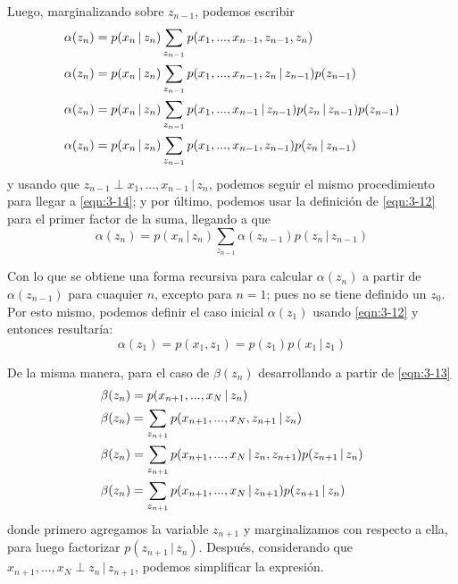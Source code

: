 Luego, marginalizando sobre $z_{n-1}$, podemos escribir
\begin{align}  
  \alpha(z_n) &= p(x_n \,|\, z_n) \sum_{z_{n-1}} 
    p(x_1, ..., x_{n-1}, z_{n-1}, z_n) 
    \notag \\ 
  \alpha(z_n) &= p(x_n \,|\, z_n) \sum_{z_{n-1}} 
    p(x_1, ..., x_{n-1}, z_n \,|\, z_{n-1}) p(z_{n-1})
    \notag \\ 
  \alpha(z_n) &= p(x_n \,|\, z_n) \sum_{z_{n-1}} 
    p(x_1, ..., x_{n-1} \,|\, z_{n-1}) p(z_n \,|\, z_{n-1}) p(z_{n-1})
    \notag \\ 
  \alpha(z_n) &= p(x_n \,|\, z_n) \sum_{z_{n-1}} 
    p(x_1, ..., x_{n-1}, z_{n-1}) p(z_n \,|\, z_{n-1})
    \label{eqn:3-14}
\end{align}
y usando que $z_{n-1} \perp x_1, ... , x_{n-1} \,|\, z_n$, podemos seguir el mismo procedimiento para llegar a \eqref{eqn:3-14}; y por último, podemos usar la definición de \eqref{eqn:3-12} para el primer factor de la suma, llegando a que
\begin{equation}
  \alpha(z_n) = p(x_n \,|\, z_n) \sum_{z_{n-1}} 
    \alpha(z_{n-1}) p(z_n \,|\, z_{n-1})
    \label{eqn:3-15}
\end{equation}

Con lo que se obtiene una forma recursiva para calcular $\alpha(z_n)$ a partir de $\alpha(z_{n-1})$ para cuaquier $n$, excepto para $n = 1$; pues no se tiene definido un $z_0$. Por esto mismo, podemos definir el caso inicial $\alpha(z_1)$ usando \eqref{eqn:3-12} y entonces resultaría:
\begin{equation}
  \alpha(z_1) = p(x_1, z_1) = p(z_1) p(x_1 \,|\, z_1) 
  \label{eqn:3-16}
\end{equation}

De la misma manera, para el caso de $\beta(z_n)$ desarrollando a partir de  \eqref{eqn:3-13}
\begin{align}
  \beta(z_n) &= p(x_{n+1}, ..., x_N \,|\, z_n)
    \notag \\
  \beta(z_n) &= \sum_{z_{n+1}} p(x_{n+1}, ..., x_N, z_{n+1} \,|\, z_n)
    \notag \\
  \beta(z_n) &= \sum_{z_{n+1}} p(x_{n+1}, ..., x_N \,|\, z_n, z_{n+1}) 
    p(z_{n+1} \,|\, z_n)
    \notag \\
  \beta(z_n) &= \sum_{z_{n+1}} p(x_{n+1}, ..., x_N \,|\, z_{n+1}) 
    p(z_{n+1} \,|\, z_n)  
    \notag 
\end{align}
donde primero agregamos la variable $z_{n+1}$ y marginalizamos con respecto a ella, para luego factorizar $p(z_{n+1} \,|\, z_n)$. Después, considerando que 
$x_{n+1}, ..., x_N \perp z_n \,|\, z_{n+1}$, podemos simplificar la expresión.


